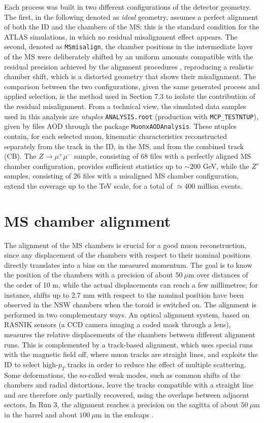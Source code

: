 \documentclass[11pt,a4paper,twoside,openright]{report}
\begin{document}
Each process was built in two different configurations of the detector geometry. The first, in the following denoted as \emph{ideal} geometry, assumes a perfect alignment of both the ID and the chambers of the MS: this is the standard condition for the ATLAS simulations, in which no residual misalignment effect appears. The second, denoted as \texttt{MSmisalign}, the chamber positions in the intermediate layer of the MS were deliberately shifted by an uniform amounts compatible with the residual precision achieved by the alignment procedures \cite{ATLAS-MCP-2023}, reproducing a realistic chamber shift, which is a distorted geometry that shows their misalignment. The comparison between the two configurations, given the same generated process and applied selection, is the method used in Section 7.3 to isolate the contribution of the residual misalignment. From a technical view, the simulated data samples used in this analysis are \emph{ntuples} \texttt{ANALYSIS.root} (production with \texttt{MCP\_TESTNTUP}), given by files AOD through the package \texttt{MuonxAODAnalysis}. These ntuples contain, for each selected muon, kinematic characteristics reconstructed separately from the track in the ID, in the MS, and from the combined track (CB). The $Z\rightarrow\mu^+\mu^-$ sample, consisting of 68 files with a perfectly aligned MS chamber configuration, provides sufficient statistics up to \(\sim 200\) GeV, while the $Z'$ samples, consisting of 26 files with a misaligned MS chamber configuration, extend the coverage up to the TeV scale, for a total of \(\simeq 400\) million events.

\section{MS chamber alignment}
The alignment of the MS chambers is crucial for a good muon reconstruction, since any displacement of the chambers with respect to their nominal positions directly translates into a bias on the measured momentum. The goal is to know the position of the chambers with a precision of about \(50\ \mu\text{m}\) over distances of the order of 10 m, while the actual displacements can reach a few millimetres; for instance, shifts up to 2.7 mm with respect to the nominal position have been observed in the NSW chambers when the toroid is switched on. The alignment is performed in two complementary ways. An optical alignment system, based on RASNIK sensors (a CCD camera imaging a coded mask through a lens), measures the relative displacements of the chambers between different alignment runs. This is complemented by a track-based alignment, which uses special runs with the magnetic field off, where muon tracks are straight lines, and exploits the ID to select high-\(p_T\) tracks in order to reduce the effect of multiple scattering. Some deformations, the so-called weak modes, such as common shifts of the chambers and radial distortions, leave the tracks compatible with a straight line and are therefore only partially recovered, using the overlaps between adjacent sectors. In Run 3, the alignment reaches a precision on the sagitta of about \(50\ \mu\text{m}\) in the barrel and about \(100\ \mu\text{m}\) in the endcaps \cite{ATLAS_MS_alignment_2021, Rasnik_ultimate}.
\end{document}
